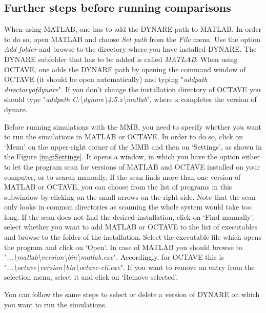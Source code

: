\subsection*{Further steps before running comparisons}
When using MATLAB, one has to add the DYNARE path to MATLAB. In order to do so, open MATLAB and choose \textit{Set path} from the \textit{File} menu. Use the option \textit{Add folder} and browse to the directory where you have installed DYNARE. The DYNARE subfolder that has to be added is called \textit{MATLAB}.
When using OCTAVE, one adds the DYNARE path by opening the command window of OCTAVE (it should be open automatically) and typing "\textit{addpath directoryofdynare}". If you don't change the installation directory of OCTAVE you should type "\textit{addpath C:\textbackslash dynare\textbackslash 4.5.x\textbackslash matlab}", where x completes the version of dynare.   

Before running simulations with the MMB, you need to specify whether you want to run the simulations in MATLAB or OCTAVE. In order to do so, click on `Menu' on the upper-right corner of the MMB and then on `Settings', as shown in the Figure \ref{img:Settings}. It opens a window, in which you have the option either to let the program scan for versions of MATLAB and OCTAVE installed on your computer, or to search manually. If the scan finds more than one version of MATLAB or OCTAVE, you can choose from the list of programs in this subwindow by clicking on the small arrows on the right side. Note that the scan only looks in common directories as scanning the whole system would take too long. If the scan does not find the desired installation, click on `Find manually', select whether you want to add MATLAB or OCTAVE to the list of executables  and browse to the folder of the installation. Select the executable file which opens the program and click on `Open'. In case of MATLAB you should browse to "\textit{...\textbackslash matlab\textbackslash version\textbackslash bin\textbackslash matlab.exe}". Accordingly, for OCTAVE this is "\textit{...\textbackslash octave\textbackslash version\textbackslash bin\textbackslash octave-cli.exe}". If you want to remove an entry from the selection menu, select it and click on `Remove selected'.

You can follow the same steps  to select or delete a version of DYNARE on which you want to run the simulations.

